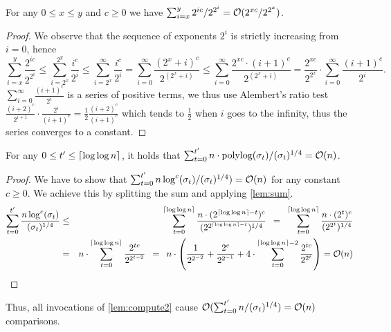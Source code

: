 \begin{lemma}
\label{lem:sum}
For any $0\leq x\leq y$ and $c \geq 0$ we have $\sum_{i=x}^{y} 2^{ic}/2^{2^{i}} = \mathcal{O}(2^{xc}/2^{2^{x}})$.
\end{lemma}

\begin{proof}
We observe that the sequence of exponents $2^{i}$ is strictly increasing from $i=0$, hence
\[ \sum_{i=x}^{y} \frac{2^{ic}}{2^{2^{i}}} \leq \sum_{i=2^{x}}^{2^{y}} \frac{i^c}{2^{i}} \leq \sum_{i=2^{x}}^{\infty} \frac{i^c}{2^{i}} = \sum_{i=0}^{\infty} \frac{(2^x+i)^c}{2^{(2^x+i)}} \leq \sum_{i=0}^{\infty} \frac{2^{xc} \cdot (i+1)^c}{2^{(2^x+i)}} =
\frac{2^{xc}}{2^{2^x}} \cdot \sum_{i=0}^{\infty} \frac{(i+1)^c}{2^{i}} .\]
$\sum_{i=0}^{\infty} \frac{(i+1)^c}{2^{i}}$ is a series of positive terms, we thus use Alembert's ratio test $ \frac{(i+2)^c}{2^{i+1}} \cdot \frac{2^{i}}{(i+1)^c} = \frac{1}{2}\frac{(i+2)^c}{(i+1)^c}$ which tends to $\frac{1}{2}$ when $i$ goes to the infinity, thus the series converges to a constant.
\end{proof}


\begin{corollary}
\label{lem:polylog}
For any $0 \leq t' \leq \left\lceil\log \log n\right\rceil$, it holds that $\sum_{t=0}^{t'} n \cdot \textnormal{polylog}(\sigma_t)/(\sigma_{t})^{1/4} = \mathcal{O}(n)$.
\begin{proof}\belowdisplayskip=-10pt
We have to show that $\sum_{t=0}^{t'} n \log^c(\sigma_t)/(\sigma_{t})^{1/4}) = \mathcal{O}(n)$ for any constant $c \geq 0$. We achieve this by splitting the sum and applying \cref{lem:sum}.
\begin{eqnarray*}
\sum_{t=0}^{t'} \frac{n \log^c(\sigma_t)}{(\sigma_{t})^{1/4}} &\leq& \sum_{t=0}^{\lceil \log\log n\rceil} \frac{n  \cdot (2^{\lceil \log\log n\rceil - t})^c}{(2^{2^{\lceil \log\log n\rceil - t}})^{1/4}} \enskip = \enskip \sum_{t=0}^{\lceil \log\log n\rceil} \frac{n  \cdot (2^{t})^c}{(2^{2^{t}})^{1/4}}\\
&=& n \cdot \sum_{t=0}^{\lceil \log\log n\rceil} \frac{2^{tc}}{2^{2^{t-2}}} \enskip=\enskip
n \cdot \left(\frac{1}{2^{2^{-2}}}+\frac{2^c}{2^{2^{-1}}} +  4 \cdot \sum_{t=0}^{\lceil \log\log n\rceil-2} \frac{2^{tc}}{2^{2^{t}}}\right) = \mathcal{O}(n)
\end{eqnarray*}
\null\hfill\null
\end{proof}
\end{corollary}


Thus, all invocations of \cref{lem:compute2} cause $\mathcal{O}(\sum_{t=0}^{t'} n/(\sigma_{t})^{1/4}) = \mathcal{O}(n)$ comparisons.

